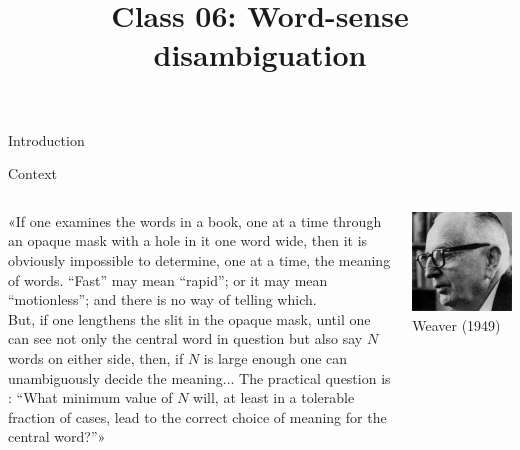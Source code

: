 \documentclass[10pt, compress]{beamer}
\title{Class 06: Word-sense disambiguation}
\date{}
\begin{document}
\maketitle


\begin{frame}{Introduction}


\end{frame}

\begin{frame}{Context}

\begin{columns}
  \begin{column}{0.74\textwidth}
    «If one examines the words in a book, one at a time through an opaque mask 
    with a hole in it one word wide, then it is
     obviously impossible to determine, one at a 
    time, the meaning of words. ``Fast'' may mean ``rapid''; or it may mean ``motionless''; 
    and there is no way of telling which. 
    ~\\
    But, if one lengthens the slit in the opaque mask, until one can see not only 
    the central word in question but also say $N$ 
    words on either side, then, if $N$ is large 
    enough one can unambiguously decide the meaning...
    The 
    practical question is : ``What minimum value of $N$ will, at 
    least in a tolerable fraction of cases, lead to the correct choice 
    of meaning for the central word?''»
  \end{column}
  \begin{column}{0.25\textwidth}
    \begin{flushright}
    \includegraphics[width=\textwidth]{graphics/portrait-weaver-600w.jpg} \\
    Weaver (1949)
    \end{flushright}
  \end{column}
\end{columns}

\end{frame}
\end{document}
